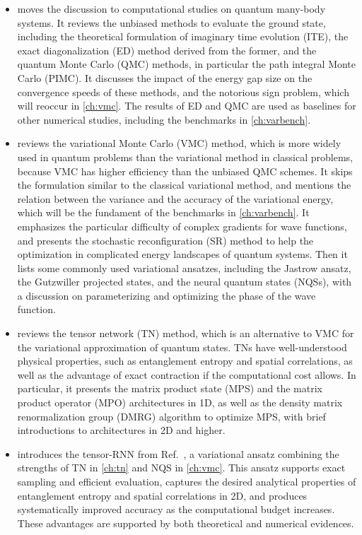 \begin{itemize}
\item {} moves the discussion to computational studies on quantum many-body systems. It reviews the unbiased methods to evaluate the ground state, including the theoretical formulation of imaginary time evolution (ITE), the exact diagonalization (ED) method derived from the former, and the quantum Monte Carlo (QMC) methods, in particular the path integral Monte Carlo (PIMC).
It discusses the impact of the energy gap size on the convergence speeds of these methods, and the notorious sign problem, which will reoccur in \cref{ch:vmc}.
The results of ED and QMC are used as baselines for other numerical studies, including the benchmarks in \cref{ch:varbench}.
\item {} reviews the variational Monte Carlo (VMC) method, which is more widely used in quantum problems than the variational method in classical problems, because VMC has higher efficiency than the unbiased QMC schemes.
It skips the formulation similar to the classical variational method, and mentions the relation between the variance and the accuracy of the variational energy, which will be the fundament of the benchmarks in \cref{ch:varbench}.
It emphasizes the particular difficulty of complex gradients for wave functions, and presents the stochastic reconfiguration (SR) method to help the optimization in complicated energy landscapes of quantum systems.
Then it lists some commonly used variational ansatzes, including the Jastrow ansatz, the Gutzwiller projected states, and the neural quantum states (NQSs), with a discussion on parameterizing and optimizing the phase of the wave function.
\item {} reviews the tensor network (TN) method, which is an alternative to VMC for the variational approximation of quantum states. TNs have well-understood physical properties, such as entanglement entropy and spatial correlations, as well as the advantage of exact contraction if the computational cost allows.
In particular, it presents the matrix product state (MPS) and the matrix product operator (MPO) architectures in 1D, as well as the density matrix renormalization group (DMRG) algorithm to optimize MPS, with brief introductions to architectures in 2D and higher.
\item {} introduces the tensor-RNN from Ref.~\cite{wu2023tensor}, a variational ansatz  combining the strengths of TN in \cref{ch:tn} and NQS in \cref{ch:vmc}. This ansatz supports exact sampling and efficient evaluation, captures the desired analytical properties of entanglement entropy and spatial correlations in 2D, and produces systematically improved accuracy as the computational budget increases. These advantages are supported by both theoretical and numerical evidences.

\end{itemize}
